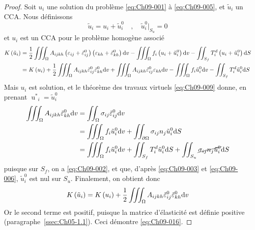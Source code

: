 \begin{proof}
    Soit $u_i$ une solution du problème \eqref{eq:Ch09-001} à \eqref{eq:Ch09-005}, et $\tilde{u}_i$ un CCA.
    Nous définissons
    \begin{equation}
        \tilde{u}_i = u_i + \tilde{u}_i^0 \quad,\quad \tilde{u}_i^0|_{S_u} = 0
        \label{eq:Ch09-017}
    \end{equation}
    et $u_i$ est un CCA pour le problème homogène associé 
    \begin{align*}
        K\left(\tilde{u}_i\right) &=\frac{1}{2} \iiint_{\Omega} A_{ijkh} \left( \varepsilon_{ij} + \tilde{\varepsilon}_{ij}^0 \right) \left( \varepsilon_{kh} + \tilde{\varepsilon}_{kh}^0 \right) \mathrm{d} v - \iiint_{\Omega} f_i \left( u_i + \tilde{u}_i^0 \right) \mathrm{d} v - \iint_{S_f} T_i^d \left( u_i + \tilde{u}_i^0 \right) \mathrm{d} S \\
        &= K\left( u_i \right) + \frac{1}{2} \iiint_{\Omega} A_{ijkh} \tilde{\varepsilon}_{ij}^0 \tilde{\varepsilon}_{kh}^0 \mathrm{d} v + \iiint_{\Omega} A_{ijkh} \tilde{\varepsilon}_{ij}^0 \varepsilon_{kh} \mathrm{d} v - \iiint_{\Omega} f_i \tilde{u}_i^0 \mathrm{d} v - \iint_{S_f} T_i^d \tilde{u}_i^0 \mathrm{d} S
    \end{align*}
    Mais $u_i$ est solution, et le théorème des travaux virtuels \eqref{eq:Ch09-009} donne, en prenant ${\mathop{u}^{\ast}}_i = \tilde{u}_i^0$
    \begin{align*}
        \iiint_{\Omega} A_{ijkh} \tilde{\varepsilon}_{kh}^0 \mathrm{d} v &= \iint_{\Omega} \sigma_{ij} \tilde{\varepsilon}_{ij}^0 \mathrm{d} v \\
        &= \iiint_{\Omega} f_i \tilde{u}_i^0 \mathrm{d} v + \iint_{\partial \Omega} \sigma_{ij} n_j \tilde{u}_i^0 \mathrm{d} S \\
        &= \iiint_{\Omega} f_i \tilde{u}_i^0 \mathrm{d} v + \iint_{S_f} T_i^d \tilde{u}_i^0 \mathrm{d} S + \iint_{S_u} \cancel{\sigma_{ij} n_j \tilde{u}_i^0} \mathrm{d} S
    \end{align*}
    puisque sur $S_f$, on a \eqref{eq:Ch09-002}, et que, d'après \eqref{eq:Ch09-003} et \eqref{eq:Ch09-006}, $\tilde{u}_i^0$ est nul sur $S_u$.
    Finalement, on obtient donc
    \begin{equation}
        K\left( \tilde{u}_i \right) = K \left( u_i \right) + \frac{1}{2} \iiint_{\Omega} A_{ijkh} \tilde{\varepsilon}_{ij}^0 \tilde{\varepsilon}_{kh}^0 \mathrm{d} v
        \label{eq:Ch09-018}
    \end{equation}
    Or le second terme est positif, puisque la matrice d'élasticité est définie positive (paragraphe~\ref{ssec:Ch05-1.1}).
    Ceci démontre \eqref{eq:Ch09-016}.
\end{proof}

